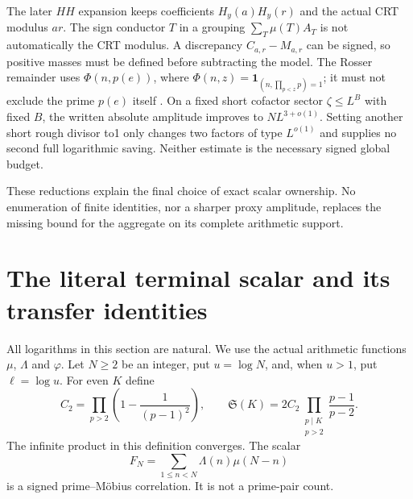 \documentclass[11pt,a4paper]{article}
\theoremstyle{definition}
\theoremstyle{remark}
\newcommand{\ind}{\mathbf1}
\begin{document}
The later $HH$ expansion keeps coefficients $H_y(a)H_y(r)$ and the actual CRT modulus $ar$. The sign conductor $T$ in a grouping $\sum_T\mu(T)A_T$ is not automatically the CRT modulus. A discrepancy $C_{a,r}-M_{a,r}$ can be signed, so positive masses must be defined before subtracting the model. The Rosser remainder uses $\Phi(n,p(e))$, where $\Phi(n,z)=\ind_{(n,\prod_{p<z}p)=1}$; it must not exclude the prime $p(e)$ itself \cite{Motohashi}. On a fixed short cofactor sector $\zeta\le L^B$ with fixed $B$, the written absolute amplitude improves to $NL^{3+o(1)}$. Setting another short rough divisor to1 only changes two factors of type $L^{o(1)}$ and supplies no second full logarithmic saving. Neither estimate is the necessary signed global budget.

These reductions explain the final choice of exact scalar ownership. No enumeration of finite identities, nor a sharper proxy amplitude, replaces the missing bound for the aggregate on its complete arithmetic support.



\section{The literal terminal scalar and its transfer identities}
\label{sec:terminal-ledger}

All logarithms in this section are natural.  We use the actual arithmetic
functions $\mu$, $\Lambda$ and $\varphi$.  Let $N\geq2$ be an integer,
put $u=\log N$, and, when $u>1$, put $\ell=\log u$.  For even $K$ define
\begin{equation}
 C_2=\prod_{p>2}\left(1-\frac1{(p-1)^2}\right),\qquad
 \mathfrak S(K)=2C_2\prod_{\substack{p\mid K\\p>2}}
                       \frac{p-1}{p-2}.
 \label{eq:sector-singular-definition}
\end{equation}
The infinite product in this definition converges.  The scalar
\begin{equation}
 F_N=\sum_{1\leq n<N}\Lambda(n)\mu(N-n)
 \label{eq:sector-FN}
\end{equation}
is a signed prime--M\"obius correlation.  It is not a prime-pair count.
\end{document}
